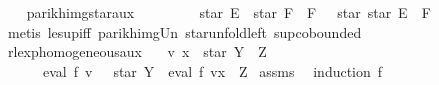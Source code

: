 \begin{isabellebody}
\isanewline
\ \ \isamarkupfalse%
\ parikh{\isacharunderscore}{\kern0pt}img{\isacharunderscore}{\kern0pt}star{}{\isacharunderscore}{\kern0pt}aux{}\isanewline
\ \ \ \ \isamarkupfalse%
\ {\isachardoublequoteopen}{\isasymPsi}\ {\isacharparenleft}{\kern0pt}{\isacharbraceleft}{\kern0pt}{\isacharbrackleft}{\kern0pt}{\isacharbrackright}{\kern0pt}{\isacharbraceright}{\kern0pt}\ {\isasymunion}\ star\ E\ {\isacharat}{\kern0pt}{\isacharat}{\kern0pt}\ star\ F\ {\isacharat}{\kern0pt}{\isacharat}{\kern0pt}\ F{\isacharparenright}{\kern0pt}\ {\isasymsubseteq}\ {\isasymPsi}\ {\isacharparenleft}{\kern0pt}star\ {\isacharparenleft}{\kern0pt}star\ E\ {\isacharat}{\kern0pt}{\isacharat}{\kern0pt}\ F{\isacharparenright}{\kern0pt}{\isacharparenright}{\kern0pt}{\isachardoublequoteclose}\isanewline
\ \ \ \ \isamarkupfalse%
\ {\isacharparenleft}{\kern0pt}metis\ le{\isacharunderscore}{\kern0pt}sup{\isacharunderscore}{\kern0pt}iff\ parikh{\isacharunderscore}{\kern0pt}img{\isacharunderscore}{\kern0pt}Un\ star{\isacharunderscore}{\kern0pt}unfold{\isacharunderscore}{\kern0pt}left\ sup{\isachardot}{\kern0pt}cobounded{}{\isacharparenright}{\kern0pt}\isanewline
{}\isamarkupfalse%
%
\endisatagproof
{\isafoldproof}%
%
\isadelimproof
%
\endisadelimproof
%
\isadelimdocument
%
\endisadelimdocument
%
\isatagdocument
%
\isamarkuptrue%
%
\endisatagdocument
{\isafolddocument}%
%
\isadelimdocument
%
\endisadelimdocument
{}\isamarkupfalse%
\ rlexp{\isacharunderscore}{\kern0pt}homogeneous{\isacharunderscore}{\kern0pt}aux{\isacharcolon}{\kern0pt}\isanewline
\ \ \ {\isachardoublequoteopen}v\ x\ {\isacharequal}{\kern0pt}\ star\ Y\ {\isacharat}{\kern0pt}{\isacharat}{\kern0pt}\ Z{\isachardoublequoteclose}\isanewline
\ \ \ \ \ {\isachardoublequoteopen}{\isasymPsi}\ {\isacharparenleft}{\kern0pt}eval\ f\ v{\isacharparenright}{\kern0pt}\ {\isasymsubseteq}\ {\isasymPsi}\ {\isacharparenleft}{\kern0pt}star\ Y\ {\isacharat}{\kern0pt}{\isacharat}{\kern0pt}\ eval\ f\ {\isacharparenleft}{\kern0pt}v{\isacharparenleft}{\kern0pt}x\ {\isacharcolon}{\kern0pt}{\isacharequal}{\kern0pt}\ Z{\isacharparenright}{\kern0pt}{\isacharparenright}{\kern0pt}{\isacharparenright}{\kern0pt}{\isachardoublequoteclose}\isanewline
%
\isadelimproof
%
\endisadelimproof
%
\isatagproof
{}\isamarkupfalse%
\ assms\ \isamarkupfalse%
\ {\isacharparenleft}{\kern0pt}induction\ f{\isacharparenright}{\kern0pt}\isanewline

\end{isabellebody}

